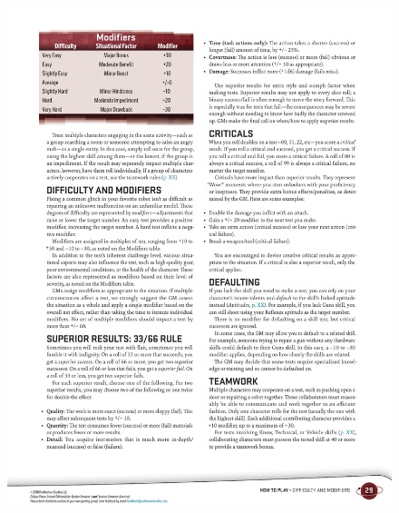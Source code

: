 \begin{figure}[htb!]%
   \centering
   \includegraphics[scale=0.95]{gfx/dice-modifiers}%
\end{figure}%

